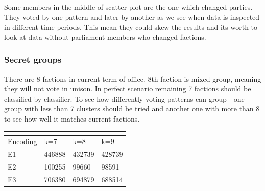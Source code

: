 \documentclass[a4paper,12pt]{article}
\begin{document}
	Some members in the middle of scatter plot are the one which changed parties. They voted by one pattern and later by another as we see when data is inspected in different time periods. This mean they could skew the results and its worth to look at data without parliament members who changed factions.

	\clearpage


	
	\subsubsection{Secret groups}
	
	There are 8 factions in current term of office. 8th faction is mixed group, meaning they will not vote in unison. In perfect scenario remaining 7 factions should be classified by classifier. To see how differently voting patterns can group - one group with less than 7 clusters should be tried and another one with more than 8 to see how well it matches current factions.

   	
   		\noindent
   	\begin{center}
   		\begin{tabular}{L{3cm} C{2cm} C{2cm} C{2cm}}
   			\\ 
   			\hline
   			Encoding & k=7 & k=8 & k=9 \\\hline
   			E1 & 446888 & 432739 & 428739 \\
   			E2 & 100255 & 99660 & 98591 \\
   			E3 & 706380 & 694879 & 688514 \\
   			
   			\hline
   		\end{tabular}
   		 \label{tab:k_means_performance_secret}
   	\end{center} 
   
\end{document}
